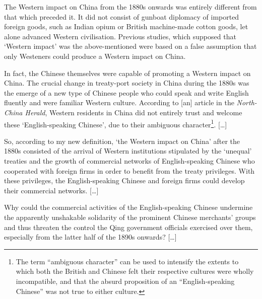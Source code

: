 \begin{fancyquote}
        [\ldots] The Western impact on China from the 1880s onwards was entirely different from that which preceded it. It did not consist of gunboat diplomacy of imported foreign goods, such as Indian opium or British machine-made cotton goods, let alone advanced Western civilisation. Previous studies, which supposed that `Western impact' was the above-mentioned were based on a false assumption that only Westeners could produce a Western impact on China.

        In fact, the Chinese themselves were capable of promoting a Western impact on China. The crucial change in treaty-port society in China during the 1880s was the emerge of a new type of Chinese people who could speak and write English fluently and were familiar Western culture. According to [an] article in the \textit{North-China Herald}, Western residents in China did not entirely trust and welcome these `English-speaking Chinese', due to their ambiguous character\footnote{The term ``ambiguous character'' can be used to intensify the extents to which both the British and Chinese felt their respective cultures were wholly incompatible, and that the absurd proposition of an ``English-speaking Chinese'' was not true to either culture.}. [\ldots]

        So, according to my new definition, `the Western impact on China' after the 1880s consisted of the arrival of Western institutions stipulated by the `unequal' treaties and the growth of commercial networks of English-speaking Chinese who cooperated with foreign firms in order to benefit from the treaty privileges. With these privileges, the English-speaking Chinese and foreign firms could develop their commercial networks. [\ldots]

        Why could the commercial activities of the English-speaking Chinese undermine the apparently unshakable solidarity of the prominent Chinese merchants' groups and thus threaten the control the Qing government officials exercised over them, especially from the latter half of the 1890s onwards? [\ldots]
	\begin{flushright}
		\autocite{Motono:2000}
	\end{flushright}
\end{fancyquote}

